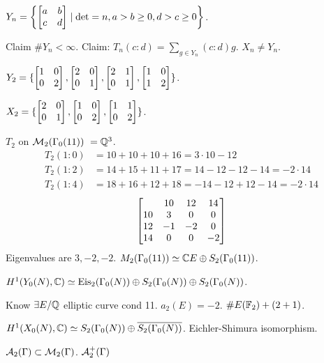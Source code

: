 \documentclass[]{article}
\begin{document}
$Y_n = \left\{\begin{bmatrix}a&b\\c&d\end{bmatrix} \mid \det = n, a>b\geq 0, d>c\geq 0 \right\}$.

Claim $\#Y_n < \infty$. Claim: $T_n(c:d) = \sum_{g\in Y_n}(c:d)g$. $X_n \neq Y_n$.

\begin{example}
	$Y_2 = \{\begin{bmatrix}1&0\\0&2\end{bmatrix},\begin{bmatrix}2&0\\0&1\end{bmatrix},\begin{bmatrix}2&1\\0&1\end{bmatrix},\begin{bmatrix}1&0\\1&2\end{bmatrix}\}$.
\end{example}
\begin{example}
	$X_2 = \{\begin{bmatrix}2&0\\0&1\end{bmatrix},\begin{bmatrix}1&0\\0&2\end{bmatrix},\begin{bmatrix}1&1\\0&2\end{bmatrix}\}$.
\end{example}

\begin{example}
	$T_2$ on $\mathcal{M}_2(\Gamma_0(11)) ~ = \mathbb{Q}^3$.
	\begin{align*}
		T_2(1:0) &= 10+10+10+16 = 3\cdot10-12 \\
		T_2(1:2) &= 14+15+11+17 = 14-12-12-14 = -2\cdot 14 \\
		T_2(1:4) &= 18+16+12+18 = -14 - 12 + 12 -14 = -2\cdot 14
	\end{align*}
	$$\begin{bmatrix}&10&12&14\\10&3&0&0\\12&-1&-2&0\\14&0&0&-2\end{bmatrix}$$
	Eigenvalues are $3,-2,-2$. $M_2(\Gamma_0(11)) \simeq \mathbb{C}E \oplus S_2(\Gamma_0(11))$.
\end{example}
$H^1(Y_0(N),\mathbb{C}) \simeq \text{Eis}_2(\Gamma_0(N)) \oplus S_2(\Gamma_0(N)) \oplus S_2(\Gamma_0(N))$.

Know $\exists E/\mathbb{Q}$ elliptic curve cond 11. $a_2(E) = -2$. $\#E(\mathbb{F}_2) + (2+1)$.

$H^1(X_0(N),\mathbb{C}) \simeq S_2(\Gamma_0(N)) \oplus \overline{S_2(\Gamma_0(N))}$. Eichler-Shimura isomorphism.

$\mathcal{A}_2(\Gamma) \subset \mathcal{M}_2(\Gamma)$. $\mathcal{A}_2^+(\Gamma)$
\end{document}
